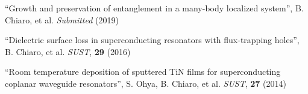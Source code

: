 \item ``Growth and preservation of entanglement in a many-body localized system'', B. Chiaro, et al. \emph{Submitted} (2019)
\item ``Dielectric surface loss in superconducting resonators with flux-trapping holes'', B. Chiaro, et al. \emph{SUST}, {\textbf{29}} (2016)
\item ``Room temperature deposition of sputtered TiN films for superconducting coplanar waveguide resonators'', S. Ohya, B. Chiaro, et al. \emph{SUST}, {\textbf{27}} (2014)

